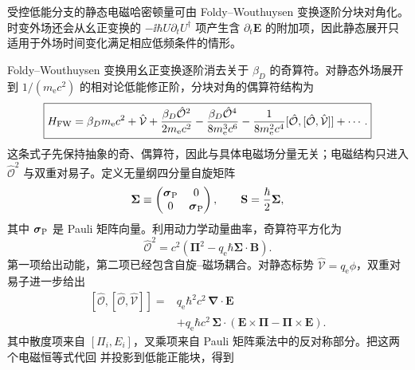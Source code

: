 受控低能分支的静态电磁哈密顿量可由 Foldy--Wouthuysen 变换逐阶分块对角化。时变外场还会从幺正变换的 $-\ii\hbar U\partial_tU^\dagger$ 项产生含 $\partial_t\mathbf E$ 的附加项，因此静态展开只适用于外场时间变化满足相应低频条件的情形。

Foldy--Wouthuysen 变换用幺正变换逐阶消去关于 $\beta_D$ 的奇算符。对静态外场展开到 $1/(m_{\mathrm e} c^2)$ 的相对论低能修正阶，分块对角的偶算符结构为
\begin{equation}
 \boxed{
 H_{\rm FW}
 =\beta_Dm_{\mathrm e} c^2+\hat{\mathcal V}
 +\frac{\beta_D\hat{\mathcal O}^2}{2m_{\mathrm e} c^2}
 -\frac{\beta_D\hat{\mathcal O}^4}{8m_{\mathrm e}^3c^6}
 -\frac{1}{8m_{\mathrm e}^2c^4}[\hat{\mathcal O},[\hat{\mathcal O},\hat{\mathcal V}]]
 +\cdots.}
 \label{eq:fw-even-operator-form-r16}
\end{equation}
这条式子先保持抽象的奇、偶算符，因此与具体电磁场分量无关；电磁结构只进入 $\hat{\mathcal O}^2$ 与双重对易子。定义无量纲四分量自旋矩阵
\begin{equation*}
 \boldsymbol\Sigma
 \equiv
 \begin{pmatrix}
 \boldsymbol\sigma_{\rm P}&0\\
 0&\boldsymbol\sigma_{\rm P}
 \end{pmatrix},
 \qquad
 \mathbf S=\frac{\hbar}{2}\boldsymbol\Sigma,
\end{equation*}
其中 $\boldsymbol\sigma_{\rm P}$ 是 Pauli 矩阵向量。利用动力学动量曲率，奇算符平方化为
\begin{equation}
 \boxed{
 \hat{\mathcal O}^2
 =c^2\left(
 \boldsymbol\Pi^2-q_{\mathrm e}\hbar\boldsymbol\Sigma\cdot\mathbf B
 \right).}
 \label{eq:fw-O2-r16}
\end{equation}
第一项给出动能，第二项已经包含自旋--磁场耦合。对静态标势 $\hat{\mathcal V}=q_{\mathrm e}\phi$，双重对易子进一步给出
\begin{equation}
 \boxed{
 \begin{aligned}
 [\hat{\mathcal O},[\hat{\mathcal O},\hat{\mathcal V}]]
 ={}&q_{\mathrm e}\hbar^2c^2\,\boldsymbol\nabla\cdot\mathbf E\\
 &+q_{\mathrm e}\hbar c^2\,
 \boldsymbol\Sigma\cdot
 \left(
 \mathbf E\times\boldsymbol\Pi
 -\boldsymbol\Pi\times\mathbf E
 \right).
 \end{aligned}}
 \label{eq:fw-double-commutator-r16}
\end{equation}
其中散度项来自 $[\Pi_i,E_i]$，叉乘项来自 Pauli 矩阵乘法中的反对称部分。把这两个电磁恒等式代回  并投影到低能正能块，得到
